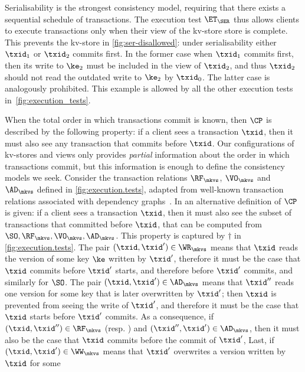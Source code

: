 Serialisability is the strongest consistency model, requiring that there exists a sequential schedule of transactions. 
The execution test $\ET_{\SER}$ thus allows clients to execute transactions only when 
their view of the kv-store store is complete.
This prevents the kv-store in  \cref{fig:ser-disallowed}: under serialisability either $\txid_1$ or $\txid_2$ commits first.
In the former case when $\txid_1$ commits first, then its write to $\ke_2$ must be included in the view of $\txid_2$, and thus $\txid_2$ should not read the outdated write to $\ke_2$ by $\txid_0$. 
The latter case is analogously prohibited. 
This example is allowed by all the other execution tests in~\cref{fig:execution_tests}.

\label{para:cp}
When the total order in which transactions commit is known, then 
$\CP$ is described by the following property: 
if a client sees a transaction $\txid$,
then it must also see any transaction that commits before $\txid$. 
Our configurations of kv-stores and views only provides {\em
  partial} information about the order in which transactions commit,
but this information is enough to define the consistency models we
seek. 
Consider the transaction relations $\RF_{\mkvs}$, $\VO_{\mkvs}$ and
$\AD_{\mkvs}$ defined in \ref{fig:execution.tests}, adapted from well-known
transaction relations associated with dependency graphs~\cite{adya-icde,adya}.
In \cite{laws} an alternative definition of $\CP$ is given: if a client sees a transaction $\txid$, 
then it must also see the subset of transactions that committed before $\txid$, that can 
be computed from $\SO, \RF_{\mkvs}, \VO_{\mkvs}, \AD_{\mkvs}$. This property is captured 
by $\dagger$ in \cref{fig:execution.tests}.
The pair $(\txid,\txid') \in \WR_\mkvs$ means that $\txid$ reads the version of some key $\ke$ 
written by $\txid'$, therefore  it {must} be
the case that $\txid$ commits before $\txid'$ starts, and therefore before $\txid'$ commits,
and similarly for $\SO$.
The pair $(\txid, \txid') \in \AD_{\mkvs}$ means that $\txid''$ reads one version for some key that 
is later overwritten by $\txid'$; then $\txid$ is prevented from seeing the write of $\txid'$, 
and therefore it {must} be the case that $\txid$ starts before 
$\txid'$ commits. 
As a consequence, if 
$(\txid,\txid'') \in \RF_{\mkvs}$ (resp. \SO) and $(\txid'',\txid') \in \AD_\mkvs$, then it {must} also be the case that $\txid$ commits before the commit  of $\txid'$, 
Last, if $(\txid,\txid') \in \WW_\mkvs$ means that $\txid'$ overwrites a version written by $\txid$ for some 
